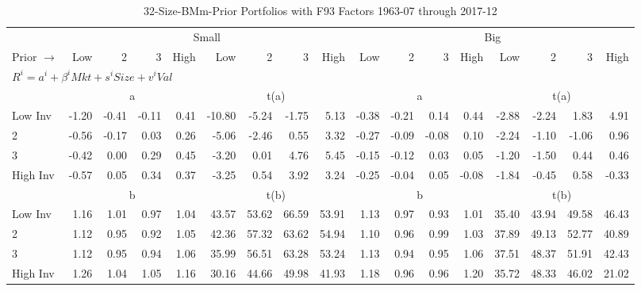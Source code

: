 
\begin{table}[!ht]
\footnotesize
\centering
\caption{32-Size-BMm-Prior Portfolios with F93 Factors 1963-07 through 2017-12}
\begin{tabular}{lrrrrrrrrrrrrrrrr}
  \toprule
    & \multicolumn{8}{c}{Small} & \multicolumn{8}{c}{Big} \\
      \cmidrule(r){2-9} \cmidrule(r){10-17}
    Prior $\rightarrow$ & Low & 2 & 3 & High & Low & 2 & 3 & High & Low & 2 & 3 & High & Low & 2 & 3 & High \\ 
  \midrule
  \multicolumn{17}{l}{$R^i=a^i+\beta^iMkt+s^iSize+v^iVal$} \\

  
    
      & \multicolumn{4}{c}{a} & \multicolumn{4}{c}{t(a)}
    
      & \multicolumn{4}{c}{a} & \multicolumn{4}{c}{t(a)}
    
    \\
      \cmidrule(r){2-5} \cmidrule(r){6-9} \cmidrule(r){10-13} \cmidrule(r){14-17}

    Low Inv   & -1.20  & -0.41  & -0.11  & 0.41  & -10.80  & -5.24  & -1.75  & 5.13  & -0.38  & -0.21  & 0.14  & 0.44  & -2.88  & -2.24  & 1.83  & 4.91  \\
           2  & -0.56  & -0.17  & 0.03  & 0.26  & -5.06  & -2.46  & 0.55  & 3.32  & -0.27  & -0.09  & -0.08  & 0.10  & -2.24  & -1.10  & -1.06  & 0.96  \\
           3  & -0.42  & 0.00  & 0.29  & 0.45  & -3.20  & 0.01  & 4.76  & 5.45  & -0.15  & -0.12  & 0.03  & 0.05  & -1.20  & -1.50  & 0.44  & 0.46  \\
    High Inv  & -0.57  & 0.05  & 0.34  & 0.37  & -3.25  & 0.54  & 3.92  & 3.24  & -0.25  & -0.04  & 0.05  & -0.08  & -1.84  & -0.45  & 0.58  & -0.33  \\

  
    
      & \multicolumn{4}{c}{b} & \multicolumn{4}{c}{t(b)}
    
      & \multicolumn{4}{c}{b} & \multicolumn{4}{c}{t(b)}
    
    \\
      \cmidrule(r){2-5} \cmidrule(r){6-9} \cmidrule(r){10-13} \cmidrule(r){14-17}

    Low Inv   & 1.16  & 1.01  & 0.97  & 1.04  & 43.57  & 53.62  & 66.59  & 53.91  & 1.13  & 0.97  & 0.93  & 1.01  & 35.40  & 43.94  & 49.58  & 46.43  \\
           2  & 1.12  & 0.95  & 0.92  & 1.05  & 42.36  & 57.32  & 63.62  & 54.94  & 1.10  & 0.96  & 0.99  & 1.03  & 37.89  & 49.13  & 52.77  & 40.89  \\
           3  & 1.12  & 0.95  & 0.94  & 1.06  & 35.99  & 56.51  & 63.28  & 53.24  & 1.13  & 0.94  & 0.95  & 1.06  & 37.51  & 48.37  & 51.91  & 42.43  \\
    High Inv  & 1.26  & 1.04  & 1.05  & 1.16  & 30.16  & 44.66  & 49.98  & 41.93  & 1.18  & 0.96  & 0.96  & 1.20  & 35.72  & 48.33  & 46.02  & 21.02  \\


\end{tabular}
\end{table}
